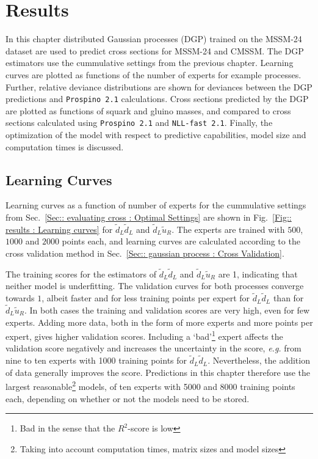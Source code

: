 \documentclass[twoside,english]{uiofysmaster}
\begin{document}
{\chapter{Results}\label{Chapter:Results}

In this chapter distributed Gaussian processes (DGP) trained on the MSSM-24 dataset are used to predict cross sections for MSSM-24 and CMSSM. The DGP estimators use the cummulative settings from the previous chapter. Learning curves are plotted as functions of the number of experts for example processes. Further, relative deviance distributions are shown for deviances between the DGP predictions and \verb|Prospino 2.1| calculations. Cross sections predicted by the DGP are plotted as functions of squark and gluino masses, and compared to cross sections calculated using \verb|Prospino 2.1| and \verb|NLL-fast 2.1|. Finally, the optimization of the model with respect to predictive capabilities, model size and computation times is discussed.

\section{Learning Curves}

Learning curves as a function of number of experts for the cummulative settings from Sec.~\ref{Sec:: evaluating cross : Optimal Settings} are shown in Fig.~\ref{Fig:: results : Learning curves} for $\widetilde{d}_L \widetilde{d}_L$ and $\widetilde{d}_L \widetilde{u}_R$. The experts are trained with $500$, $1000$ and $2000$ points each, and learning curves are calculated according to the cross validation method in Sec.~\ref{Sec:: gaussian process : Cross Validation}.

The training scores for the estimators of $\widetilde{d}_L \widetilde{d}_L$ and $\widetilde{d}_L \widetilde{u}_R$ are 1, indicating that neither model is underfitting. The validation curves for both processes converge towards $1$, albeit faster and for less training points per expert for $\widetilde{d}_L \widetilde{d}_L$ than for $\widetilde{d}_L \widetilde{u}_R$. In both cases the training and validation scores are very high, even for few experts. Adding more data, both in the form of more experts and more points per expert, gives higher validation scores. Including a `bad'\footnote{Bad in the sense that the $R^2$-score is low} expert affects the validation score negatively and increases the uncertainty in the score, \textit{e.g.} from nine to ten experts with 1000 training points for $\widetilde{d}_L \widetilde{d}_L$. Nevertheless, the addition of data generally improves the score. Predictions in this chapter therefore use the largest reasonable\footnote{Taking into account computation times, matrix sizes and model sizes} models, of ten experts with 5000 and 8000 training points each, depending on whether or not the models need to be stored.



}
\end{document}
